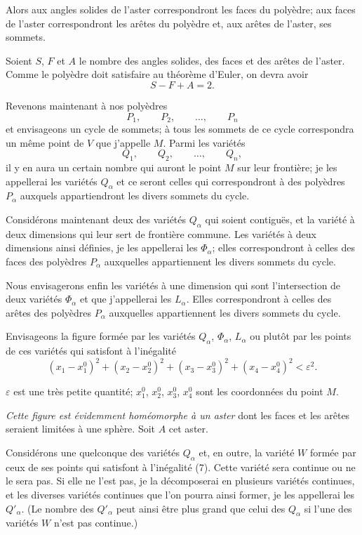 \documentclass{article}
\begin{document}
Alors aux angles solides de l'aster correspondront les faces du polyèdre; aux faces de l'aster correspondront les arêtes du polyèdre et, aux arêtes de l'aster, ses sommets.

Soient $S$, $F$ et $A$ le nombre des angles solides, des faces et des arêtes de l'aster. Comme le polyèdre doit satisfaire au théorème d'Euler, on devra avoir
\[ S - F + A = 2. \]

Revenons maintenant à nos polyèdres
\[ P_{1}, \qquad P_{2}, \qquad \ldots, \qquad P_{n} \]
et envisageons un cycle de sommets; à tous les sommets de ce cycle correspondra un même point de $V$ que j'appelle $M$. Parmi les variétés
\[ Q_{1}, \qquad Q_{2}, \qquad \ldots, \qquad Q_{n}, \]
il y en aura un certain nombre qui auront le point $M$ sur leur frontière; je les appellerai les variétés $Q_{\alpha}$ et ce seront celles qui correspondront à des polyèdres $P_{\alpha}$ auxquels appartiendront les divers sommets du cycle.

Considérons maintenant deux des variétés $Q_{\alpha}$ qui soient contiguës, et la variété à deux dimensions qui leur sert de frontière commune. Les variétés à deux dimensions ainsi définies, je les appellerai les $\Phi_{\alpha}$; elles correspondront à celles des faces des polyèdres $P_{\alpha}$ auxquelles appartiennent les divers sommets du cycle.

Nous envisagerons enfin les variétés à une dimension qui sont l'intersection
de deux variétés $\Phi_{\alpha}$ et que j'appellerai les $L_{\alpha}$. Elles correspondront à celles des arêtes des polyèdres $P_{\alpha}$ auxquelles appartiennent les divers sommets du cycle.

Envisageons la figure formée par les variétés $Q_{\alpha}$, $\Phi_{\alpha}$, $L_{\alpha}$ ou plutôt par les points de ces variétés qui satisfont à l'inégalité
\[ (x_{1} - x^{0}_{1})^{2} + (x_{2} - x^{0}_{2})^{2} + (x_{3} - x^{0}_{3})^{2} + (x_{4} - x^{0}_{4})^{2} < \varepsilon^{2}. \tag{7} \]

$\varepsilon$ est une très petite quantité; $x^{0}_{1}$, $x^{0}_{2}$, $x^{0}_{3}$, $x^{0}_{4}$ sont les coordonnées du point $M$.

\emph{Cette figure est évidemment homéomorphe à un aster} dont les faces et les arêtes seraient limitées à une sphère. Soit $A$ cet aster.

Considérons une quelconque des variétés $Q_{\alpha}$ et, en outre, la variété $W$ formée par ceux de ses points qui satisfont à l'inégalité (7). Cette variété sera continue ou ne le sera pas. Si elle ne l'est pas, je la décomposerai en plusieurs variétés continues, et les diverses variétés continues que l'on pourra ainsi former, je les appellerai les $Q'_{\alpha}$. (Le nombre des $Q'_{\alpha}$ peut ainsi être plus grand que celui des $Q_{\alpha}$ si l'une des variétés $W$ n'est pas continue.)
\end{document}
